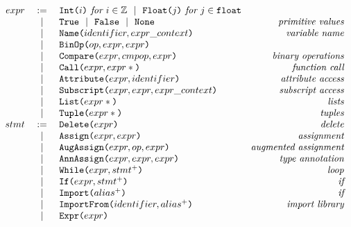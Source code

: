 \begin{figure}
\[\begin{array}{rclr}
    expr  &:=& \texttt{Int(}i\texttt{)} \textit{ for } i \in \mathbb{Z}
          ~~|~~ \texttt{Float(}j\texttt{)} \textit{ for } j \in \texttt{float} \\
          &~~|~~& \texttt{True}
          ~~|~~ \texttt{False} ~~|~~ \texttt{None}   & \textit{primitive values} \\
     &~~|~~& \texttt{Name(}identifier, expr\_context\texttt{)} & \textit{variable name} \\
     &~~|~~& \texttt{BinOp(}op, expr, expr\texttt{)} \\
     &~~|~~&   \texttt{Compare(}expr, cmpop, expr\texttt{)}             & \textit{binary operations} \\
     &~~|~~& \texttt{Call(}expr, expr*\texttt{)}                    & \textit{function call} \\
     &~~|~~& \texttt{Attribute(}expr, identifier\texttt{)}          & \textit{attribute access} \\
     &~~|~~& \texttt{Subscript(}expr, expr, expr\_context\texttt{)} & \textit{subscript access} \\
     &~~|~~& \texttt{List(}expr*\texttt{)}                          & \textit{lists} \\
     &~~|~~& \texttt{Tuple(}expr*\texttt{)}                         & \textit{tuples} \\

  stmt &:=& \texttt{Delete(}expr\texttt{)}                      & \textit{delete} \\
     &~~|~~& \texttt{Assign(}expr, expr\texttt{)}              & \textit{assignment} \\
     &~~|~~& \texttt{AugAssign(}expr, op, expr\texttt{)}       & \textit{augmented assignment} \\
     &~~|~~& \texttt{AnnAssign(}expr, expr, expr\texttt{)}     & \textit{type annotation} \\
     &~~|~~& \texttt{While(}expr, stmt^+\texttt{)}             & \textit{loop} \\
     &~~|~~& \texttt{If(}expr, stmt^+\texttt{)}                & \textit{if} \\
     &~~|~~& \texttt{Import(}alias^+\texttt{)}                 & \textit{if} \\
     &~~|~~& \texttt{ImportFrom(}identifier, alias^+\texttt{)} & \textit{import library} \\
     &~~|~~& \texttt{Expr(}expr\texttt{)}                      & \\


\end{array}\]
\end{figure}
